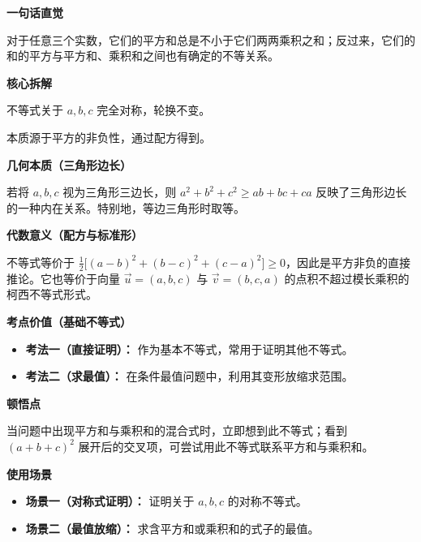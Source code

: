 \begin{explanationbox}
\textbf{\textcolor{CExplanation}{一句话直觉}}

对于任意三个实数，它们的平方和总是不小于它们两两乘积之和；反过来，它们的和的平方与平方和、乘积和之间也有确定的不等关系。

\medskip
\textbf{\textcolor{CExplanation}{核心拆解}}
\begin{description}[style=nextline, leftmargin=2.8em, labelsep=0.5em, itemsep=0.45em]
    \item[\textbf{要点一（对称性）：}] 不等式关于 $a, b, c$ 完全对称，轮换不变。
    \item[\textbf{要点二（非负性）：}] 本质源于平方的非负性，通过配方得到。
\end{description}

\medskip
\textbf{\textcolor{CExplanation}{几何本质（三角形边长）}}

若将 $a, b, c$ 视为三角形三边长，则 $a^2+b^2+c^2 \geq ab+bc+ca$ 反映了三角形边长的一种内在关系。特别地，等边三角形时取等。

\medskip
\textbf{\textcolor{CExplanation}{代数意义（配方与标准形）}}

不等式等价于 $\frac{1}{2}\bigl[(a-b)^2+(b-c)^2+(c-a)^2\bigr] \geq 0$，因此是平方非负的直接推论。它也等价于向量 $\vec{u}=(a,b,c)$ 与 $\vec{v}=(b,c,a)$ 的点积不超过模长乘积的柯西不等式形式。

\medskip
\textbf{\textcolor{CExplanation}{考点价值（基础不等式）}}
\begin{itemize}[leftmargin=*, itemsep=0.5em, topsep=0.4em]
    \item \textbf{考法一（直接证明）：} 作为基本不等式，常用于证明其他不等式。
    \item \textbf{考法二（求最值）：} 在条件最值问题中，利用其变形放缩求范围。
\end{itemize}

\medskip
\textbf{\textcolor{CExplanation}{顿悟点}}

当问题中出现平方和与乘积和的混合式时，立即想到此不等式；看到 $(a+b+c)^2$ 展开后的交叉项，可尝试用此不等式联系平方和与乘积和。

\medskip
\textbf{\textcolor{CExplanation}{使用场景}}
\begin{itemize}[leftmargin=*, itemsep=0.5em, topsep=0.4em]
    \item \textbf{场景一（对称式证明）：} 证明关于 $a, b, c$ 的对称不等式。
    \item \textbf{场景二（最值放缩）：} 求含平方和或乘积和的式子的最值。
\end{itemize}
\end{explanationbox}

